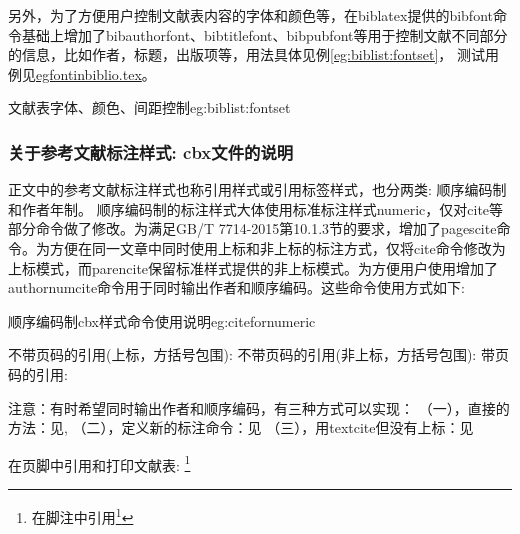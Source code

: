另外，为了方便用户控制文献表内容的字体和颜色等，在biblatex提供的bibfont命令基础上增加了bibauthorfont、bibtitlefont、bibpubfont等用于控制文献不同部分的信息，比如作者，标题，出版项等，用法具体见例\ref{eg:biblist:fontset}，
测试用例见\href{run:example/egfontinbiblio.tex}{egfontinbiblio.tex}。

\begin{example}{文献表字体、颜色、间距控制}{eg:biblist:fontset}
\begin{texlist}
%

%
\renewcommand{\bibfont}{\zihao{-5}}%
\renewcommand{\bibauthorfont}{\bfseries\color{teal}}%
\renewcommand{\bibtitlefont}{\ttfamily\color{blue}}%
\renewcommand{\bibpubfont}{\itshape\color{violet}}%
\def\UrlFont{\ttfamily} %

\setlength{\bibitemsep}{0ex}
\setlength{\bibnamesep}{0ex}
\setlength{\bibinitsep}{0ex}

\end{texlist}
\end{example}

\subsubsection{关于参考文献标注样式: cbx文件的说明}\label{sec:cbx:usage}
正文中的参考文献标注样式也称引用样式或引用标签样式，也分两类: 顺序编码制和作者年制。
顺序编码制的标注样式大体使用标准标注样式numeric，仅对cite等部分命令做了修改。为满足GB/T 7714-2015第10.1.3节的要求，增加了pagescite命令。为方便在同一文章中同时使用上标和非上标的标注方式，仅将cite命令修改为上标模式，而parencite保留标准样式提供的非上标模式。为方便用户使用增加了authornumcite命令用于同时输出作者和顺序编码。这些命令使用方式如下:

\begin{example}{顺序编码制cbx样式命令使用说明}{eg:citefornumeric}
\begin{texlist}
不带页码的引用(上标，方括号包围):
    \cite{Peebles2001-100-100}
不带页码的引用(非上标，方括号包围):
    \parencite{Miroslav2004--}
带页码的引用:
    \cite[见][49页]{蔡敏2006--}  \parencite[见][49页]{Miroslav2004--}
      
    
注意：有时希望同时输出作者和顺序编码，有三种方式可以实现：
    （一），直接的方法：见\citeauthor{refb}\cite{refb},\citeauthor{refc}\cite{refc}
    （二），定义新的标注命令：见
    （三），用textcite但没有上标：见\textcite{refb,refc}

在页脚中引用和打印文献表:
    \footnote{在脚注中引用\footcite{赵学功2001--}}  
    \end{texlist}
\end{example}

